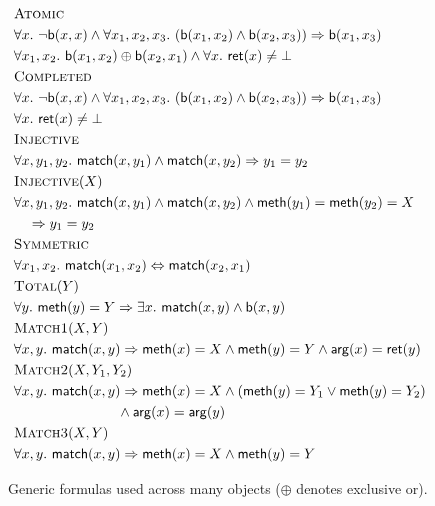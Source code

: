 \begin{figure}
  \footnotesize
  \begin{align*}
    & \textsc{Atomic} \\
    & \forall x.\ \neg {\sf b}(x,x)\land \forall x_1,x_2,x_3.\ ({\sf b}(x_1,x_2) \land {\sf b}(x_2,x_3)) \implies {\sf b}(x_1,x_3) \\
    & \forall x_1,x_2.\ 
      {\sf b}(x_1,x_2) \oplus {\sf b}(x_2,x_1) \land \forall x.\ {\sf ret}(x) \neq \bot 
    \\
    & \textsc{Completed} \\
    & \forall x.\ \neg {\sf b}(x,x)\land \forall x_1,x_2,x_3.\ ({\sf b}(x_1,x_2) \land {\sf b}(x_2,x_3)) \implies {\sf b}(x_1,x_3) \\
    & \forall x.\ {\sf ret}(x) \neq \bot
    \\
    & \textsc{Injective} \\
    & \forall x, y_1, y_2.\ {\sf match}(x, y_1) \land {\sf match}(x, y_2) \implies y_1 = y_2
    \\
    & \textsc{Injective}(X) \\
    & \forall x, y_1, y_2.\ {\sf match}(x, y_1) \land {\sf match}(x, y_2) \land {\sf meth}(y_1)={\sf meth}(y_2)=X \\
    &\quad \implies y_1 = y_2
    \\
    & \textsc{Symmetric} \\
    & \forall x_1,x_2.\ {\sf match}(x_1,x_2) \Leftrightarrow {\sf match}(x_2,x_1)
    \\
    & \textsc{Total}(Y) \\
    & \forall y.\ {\sf meth}(y) = Y \implies \exists x.\ {\sf match}(x,y) \land {\sf b}(x,y)
    \\
    & \textsc{Match1}(X,Y) \\
    & \forall x, y.\ {\sf match}(x,y) \implies 
        {\sf meth}(x) = X \land {\sf meth}(y) = Y \land {\sf arg}(x) = {\sf ret}(y)
    \\
    & \textsc{Match2}(X,Y_1,Y_2) \\
    & \forall x, y.\ {\sf match}(x,y) \implies 
      {\sf meth}(x) = X \land ({\sf meth}(y) = Y_1 \vee {\sf meth}(y) = Y_2) \\
      & \hspace{2.6cm}\land {\sf arg}(x) = {\sf arg}(y)
    \\
    & \textsc{Match3}(X,Y) \\
      & \forall x, y.\ 
        {\sf match}(x,y) \implies {\sf meth}(x) = X \land {\sf meth}(y) = Y
  \end{align*}
  \caption{Generic formulas used across many objects ($\oplus$ denotes exclusive or).}
  \label{fig:formulas:common}
\end{figure}

